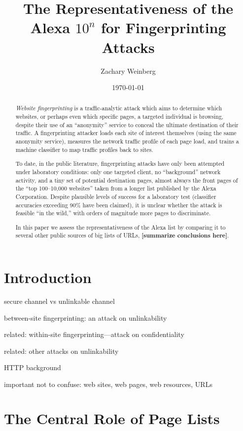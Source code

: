 \documentclass[tinymargin]{zarticle}
\def\todo#1{{\color{todocolor}\bfseries [#1]}}
\begin{document}
\title{The Representativeness of the Alexa $10^n$ for Fingerprinting Attacks}
\author{Zachary Weinberg}
\date{\today}
\maketitle

\begin{abstract}
\textit{Website fingerprinting} is a traffic-analytic attack which
aims to determine which websites, or perhaps even which specific
pages, a targeted individual is browsing, despite their use of an
“anonymity” service to conceal the ultimate destination of their
traffic.  A fingerprinting attacker loads each site of interest
themselves (using the same anonymity service), measures the network
traffic profile of each page load, and trains a machine classifier to
map traffic profiles back to sites.

To date, in the public literature, fingerprinting attacks have only
been attempted under laboratory conditions: only one targeted client,
no “background” network activity, and a tiny set of potential
destination pages, almost always the front pages of the “top
100--10,000 websites” taken from a longer list published by the Alexa
Corporation.  Despite plausible levels of success for a laboratory
test (classifier accuracies exceeding 90\% have been claimed), it is
unclear whether the attack is feasible “in the wild,” with orders of
magnitude more pages to discriminate.

In this paper we assess the representativeness of the Alexa list by
comparing it to several other public sources of big lists of URLs,
\todo{summarize conclusions here}.
\end{abstract}

\section{Introduction}

secure channel vs unlinkable channel

between-site fingerprinting: an attack on unlinkability

related: within-site fingerprinting---attack on confidentiality

related: other attacks on unlinkability

HTTP background

important not to confuse: web sites, web pages, web resources, URLs

\section{The Central Role of Page Lists}
\end{document}
